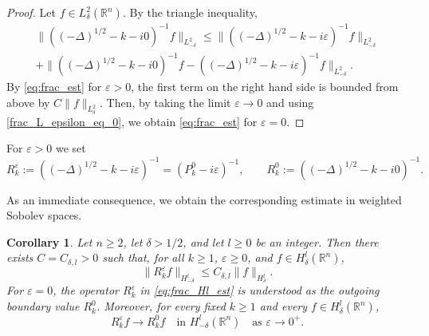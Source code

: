 \documentclass[12pt,a4paper]{amsart}
\numberwithin{equation}{section}
\theoremstyle{plain}
\newtheorem{corollary}[theorem]{Corollary}
\theoremstyle{definition}
\begin{document}
\begin{proof}
Let $f\in L^2_\delta(\mathbb R^n)$. By the triangle inequality,
\begin{multline*}
   \|\left((-\Delta)^{1/2}-k-i0\right)^{-1}f\|_{L^2_{-\delta}}
    \leq \|\left((-\Delta)^{1/2}-k-i\varepsilon\right)^{-1}f\|_{L^2_{-\delta}}\\
    + \|\left((-\Delta)^{1/2}-k-i0\right)^{-1}f - \left((-\Delta)^{1/2}-k-i\varepsilon \right)^{-1}f\|_{L^2_{-\delta}}.
\end{multline*}
By \eqref{eq:frac_est} for $\varepsilon>0$, the first term on the right hand
side is bounded from above by $C\|f\|_{L^2_\delta}$. Then, by taking the
limit $\varepsilon\to 0$ and using \eqref{frac_L_epsilon_eq_0}, we obtain
\eqref{eq:frac_est} for $\varepsilon=0$.
\end{proof}

For $\varepsilon>0$ we set 
\begin{equation*}
    R_k^\varepsilon := ((-\Delta)^{1/2} - k - i\varepsilon)^{-1} = (P_k^0 - i\varepsilon)^{-1},
    \qquad
    R_k^0 := ((-\Delta)^{1/2} - k - i0)^{-1}.
\end{equation*}

As an immediate consequence, we obtain the corresponding estimate in weighted Sobolev spaces.




\begin{corollary}\label{cor:free_frac_Hl}
Let $n\geq 2$, let $\delta> 1/2$, and let $l\geq 0$ be an integer.
Then there exists $C=C_{\delta,l}>0$ such that, for all
$k\geq 1$, $\varepsilon\geq 0$, and
$f\in H^l_\delta(\mathbb R^n)$,
\begin{equation}\label{eq:frac_Hl_est}
    \|R_k^\varepsilon f\|_{H^l_{-\delta}}
    \leq
    C_{\delta,l}\|f\|_{H^l_\delta}.
\end{equation}
For $\varepsilon=0$, the operator $R_k^\varepsilon$ in
\eqref{eq:frac_Hl_est} is understood as the outgoing boundary value $R_k^0$.
Moreover, for every fixed $k\geq 1$ and every
$f\in H^l_\delta(\mathbb R^n)$,
\begin{equation}\label{eq:free_limit_Hl}
    R_k^\varepsilon f \to R_k^0 f
    \quad \text{in } H^l_{-\delta}(\mathbb R^n)
    \quad \text{as } \varepsilon\to0^+.
\end{equation}
\end{corollary}
\end{document}
